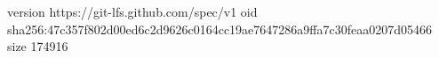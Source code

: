 version https://git-lfs.github.com/spec/v1
oid sha256:47c357f802d00ed6c2d9626c0164cc19ae7647286a9ffa7c30feaa0207d05466
size 174916
